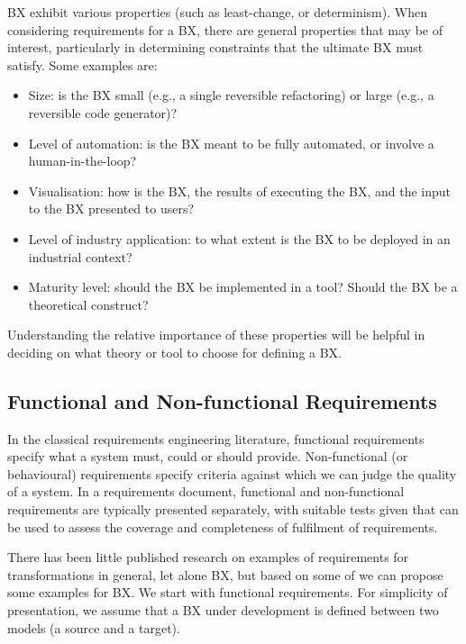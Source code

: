 BX exhibit various properties (such as least-change, or determinism). When considering requirements for a BX, there are general properties that may be of interest, particularly in determining constraints that the ultimate BX must satisfy. Some examples are:
\begin{itemize}
\item Size: is the BX small (e.g., a single reversible refactoring) or large (e.g., a reversible code generator)? 
\item Level of automation: is the BX meant to be fully automated, or involve a human-in-the-loop?
\item Visualisation: how is the BX, the results of executing the BX, and the input to the BX presented to users?
\item Level of industry application: to what extent is the BX to be deployed in an industrial context?
\item Maturity level: should the BX be implemented in a tool? Should the BX be a theoretical construct?
\end{itemize}
Understanding the relative importance of these properties will be helpful in deciding on what theory or tool to choose for defining a BX.

\subsection{Functional and Non-functional Requirements}
In the classical requirements engineering literature, functional requirements specify what a system must, could or should provide. Non-functional (or behavioural) requirements specify criteria against which we can judge the quality of a system. In a requirements document, functional and non-functional requirements are typically presented separately, with suitable tests given that can be used to assess the coverage and completeness of fulfilment of requirements.

There has been little published research on examples of requirements for transformations in general, let alone BX, but based on some of \cite{TehraniZL16,NalchigarSC13} we can propose some examples for BX. We start with functional requirements. For simplicity of presentation, we assume that a BX under development is defined between two models (a source and a target).

